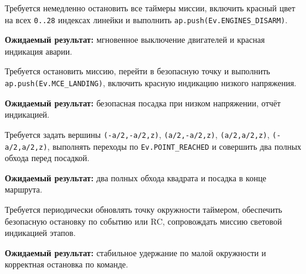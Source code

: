 \begin{taskbox}
Требуется немедленно остановить все таймеры миссии, включить красный цвет на всех \texttt{0..28} индексах линейки и выполнить \texttt{ap.push(Ev.ENGINES\_DISARM)}.

\textbf{Ожидаемый результат:} мгновенное выключение двигателей и красная индикация аварии.
\end{taskbox}

\begin{taskbox}
Требуется остановить миссию, перейти в безопасную точку и выполнить \texttt{ap.push(Ev.MCE\_LANDING)}, включить красную индикацию низкого напряжения.

\textbf{Ожидаемый результат:} безопасная посадка при низком напряжении, отчёт индикацией.
\end{taskbox}

\begin{taskbox}
Требуется задать вершины \texttt{(-a/2,-a/2,z)}, \texttt{(a/2,-a/2,z)}, \texttt{(a/2,a/2,z)}, \texttt{(-a/2,a/2,z)}, выполнять переходы по \texttt{Ev.POINT\_REACHED} и совершить два полных обхода перед посадкой.

\textbf{Ожидаемый результат:} два полных обхода квадрата и посадка в конце маршрута.
\end{taskbox}

\begin{taskbox}[«Лоитер» по малой окружности \texttt{r=0.2}]
Требуется периодически обновлять точку окружности таймером, обеспечить безопасную остановку по событию или RC, сопровождать миссию световой индикацией этапов.

\textbf{Ожидаемый результат:} стабильное удержание по малой окружности и корректная остановка по команде.
\end{taskbox}

